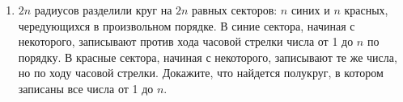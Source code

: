 \documentclass{article}
\begin{document}
\begin{enumerate}[label*=\protect\fbox{\arabic{enumi}}]
\item $2n$ радиусов разделили круг на $2n$ равных секторов: $n$ синих и $n$ красных, чередующихся в произвольном порядке. В синие сектора, начиная с некоторого, записывают против хода часовой стрелки числа от 1 до $n$ по порядку. В красные сектора, начиная с некоторого, записывают те же числа, но по ходу часовой стрелки. Докажите, что найдется полукруг, в котором записаны все числа от 1 до $n$.


\end{enumerate}
\end{document}
